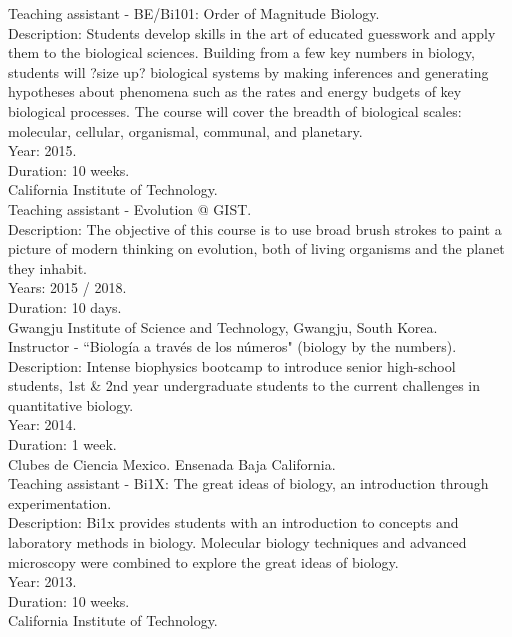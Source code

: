\documentclass[]{friggeri-cv}
\begin{document}
Teaching assistant - BE/Bi101: Order of Magnitude Biology.\\
Description: Students develop skills in the art of educated guesswork and apply them to the biological sciences. Building from a few key numbers in biology, students will ?size up? biological systems by making inferences and generating hypotheses about phenomena such as the rates and energy budgets of key biological processes. The course will cover the breadth of biological scales: molecular, cellular, organismal, communal, and planetary.\\
Year: 2015.\\
Duration: 10 weeks.\\
{California Institute of Technology.}\\

Teaching assistant - Evolution @ GIST.\\
Description: The objective of this course is to use broad brush strokes to paint a picture of modern thinking on evolution, both of living organisms and the planet they inhabit.\\
Years: 2015 / 2018.\\
Duration: 10 days.\\
{Gwangju Institute of Science and Technology, Gwangju, South Korea.}\\


Instructor - ``Biolog\'{i}a a trav\'{e}s de los n\'{u}meros" (biology by the numbers).\\
Description: Intense biophysics bootcamp to introduce senior high-school students, 1st \& 2nd year undergraduate students to the current challenges in quantitative biology.\\
Year: 2014.\\
Duration: 1 week.\\
{Clubes de Ciencia Mexico. Ensenada Baja California.}\\

Teaching assistant - Bi1X: The great ideas of biology, an introduction through experimentation.\\
Description: Bi1x provides students with an introduction to concepts and laboratory methods in biology. Molecular biology techniques and advanced microscopy were combined to explore the great ideas of biology.\\
Year: 2013.\\
Duration: 10 weeks.\\
{California Institute of Technology.}\\
\end{document}

